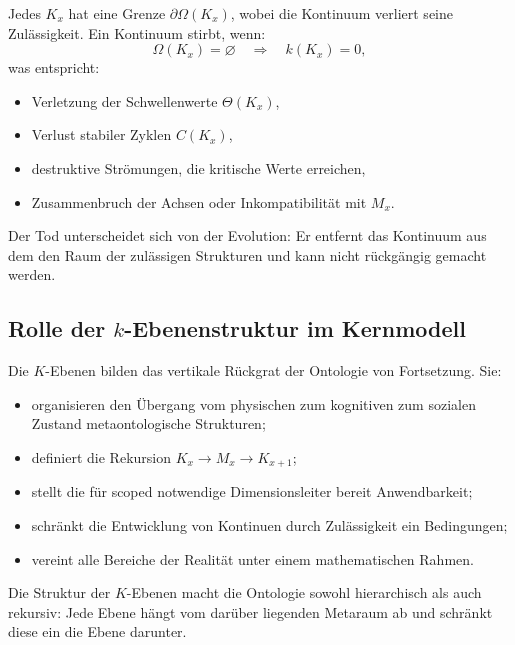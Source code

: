 Jedes $K_x$ hat eine Grenze $\partial\Omega(K_x)$, wobei die
Kontinuum verliert seine Zulässigkeit.
Ein Kontinuum stirbt, wenn:
\[
\Omega(K_x) = \varnothing
\quad\Rightarrow\quad
k(K_x) = 0,
\]
was entspricht:
\begin{itemize}
    \item Verletzung der Schwellenwerte $\Theta(K_x)$,
    \item Verlust stabiler Zyklen $C(K_x)$,
    \item destruktive Strömungen, die kritische Werte erreichen,
    \item Zusammenbruch der Achsen oder Inkompatibilität mit $M_x$.
\end{itemize}

Der Tod unterscheidet sich von der Evolution: Er entfernt das Kontinuum aus dem
den Raum der zulässigen Strukturen und kann nicht rückgängig gemacht werden.


\subsection{Rolle der \texorpdfstring{$k$}{k}-Ebenenstruktur im Kernmodell}

Die $K$-Ebenen bilden das vertikale Rückgrat der Ontologie von
Fortsetzung.
Sie:
\begin{itemize}
    \item organisieren den Übergang vom physischen zum kognitiven zum sozialen Zustand
          metaontologische Strukturen;
    \item definiert die Rekursion $K_x \to M_x \to K_{x+1}$;
    \item stellt die für scoped notwendige Dimensionsleiter bereit
          Anwendbarkeit;
    \item schränkt die Entwicklung von Kontinuen durch Zulässigkeit ein
          Bedingungen;
    \item vereint alle Bereiche der Realität unter einem mathematischen Rahmen.
\end{itemize}

Die Struktur der $K$-Ebenen macht die Ontologie sowohl hierarchisch als auch
rekursiv: Jede Ebene hängt vom darüber liegenden Metaraum ab und schränkt diese ein
die Ebene darunter.
